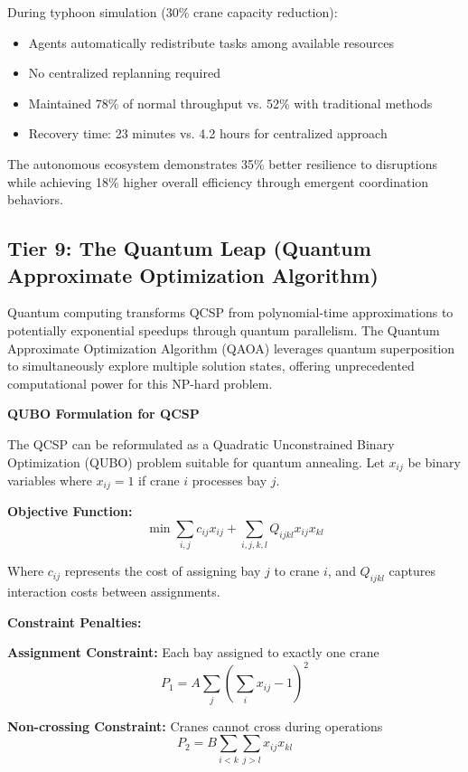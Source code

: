 \documentclass{article}
\begin{document}
During typhoon simulation (30\% crane capacity reduction):
\begin{itemize}
\item Agents automatically redistribute tasks among available resources
\item No centralized replanning required
\item Maintained 78\% of normal throughput vs. 52\% with traditional methods
\item Recovery time: 23 minutes vs. 4.2 hours for centralized approach
\end{itemize}

The autonomous ecosystem demonstrates 35\% better resilience to disruptions while achieving 18\% higher overall efficiency through emergent coordination behaviors.

\subsection{Tier 9: The Quantum Leap (Quantum Approximate Optimization Algorithm)}

Quantum computing transforms QCSP from polynomial-time approximations to potentially exponential speedups through quantum parallelism. The Quantum Approximate Optimization Algorithm (QAOA) leverages quantum superposition to simultaneously explore multiple solution states, offering unprecedented computational power for this NP-hard problem.

\textbf{QUBO Formulation for QCSP}

The QCSP can be reformulated as a Quadratic Unconstrained Binary Optimization (QUBO) problem suitable for quantum annealing. Let $x_{ij}$ be binary variables where $x_{ij} = 1$ if crane $i$ processes bay $j$.

\textbf{Objective Function:}
\begin{equation}
\min \sum_{i,j} c_{ij} x_{ij} + \sum_{i,j,k,l} Q_{ijkl} x_{ij} x_{kl}
\end{equation}

Where $c_{ij}$ represents the cost of assigning bay $j$ to crane $i$, and $Q_{ijkl}$ captures interaction costs between assignments.

\textbf{Constraint Penalties:}

\textbf{Assignment Constraint:} Each bay assigned to exactly one crane
\begin{equation}
P_1 = A \sum_j \left(\sum_i x_{ij} - 1\right)^2
\end{equation}

\textbf{Non-crossing Constraint:} Cranes cannot cross during operations
\begin{equation}
P_2 = B \sum_{i<k} \sum_{j>l} x_{ij} x_{kl}
\end{equation}
\end{document}
